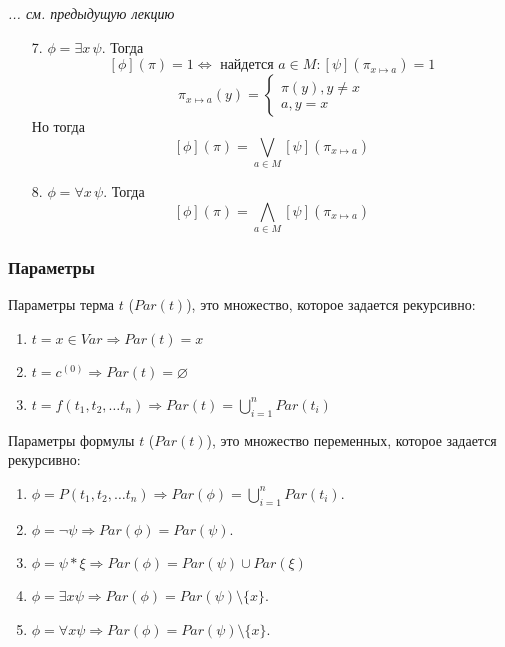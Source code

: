
\begin{center}
    \textit{... см. предыдущую лекцию}
\end{center}
\begin{enumerate}
    \item[7.] $\phi = \exists x\, \psi$. Тогда
    $$[\phi](\pi) = 1 \Leftrightarrow \text{ найдется } a \in M: [\psi](\pi_{x \mapsto a}) = 1$$
    $$\pi_{x\mapsto a}(y) = \left\{\begin{array}{l}
        \pi(y), y \ne x  \\
        a, y = x
    \end{array}\right.$$
    Но тогда 
    $$[\phi](\pi) = \bigvee_{a \in M} [\psi](\pi_{x \mapsto a})$$
    \item[8.] $\phi = \forall x\, \psi$. Тогда
    $$[\phi](\pi) = \bigwedge_{a \in M} [\psi](\pi_{x \mapsto a})$$
\end{enumerate}

\subsubsection{Параметры}

\begin{definition}
    Параметры терма $t$ ($Par(t)$), это множество, которое задается рекурсивно:
    \begin{enumerate}
        \item $t = x \in Var \Rightarrow Par(t) = x$
        \item $t = c^{(0)} \Rightarrow Par(t) = \varnothing$
        \item $t = f(t_1, t_2, \dots t_n) \Rightarrow Par(t) = \bigcup_{i = 1}^n Par(t_i)$
    \end{enumerate}
\end{definition}

\begin{definition}
    Параметры формулы $t$ ($Par(t)$), это множество переменных, которое задается рекурсивно:
    \begin{enumerate}
        \item $\phi = P(t_1, t_2, \dots t_n) \Rightarrow Par(\phi) = \bigcup_{i = 1}^n Par(t_i)$.
        \item $\phi = \neg \psi \Rightarrow Par(\phi) = Par(\psi)$.
        \item $\phi = \psi * \xi \Rightarrow Par(\phi) = Par(\psi) \cup Par(\xi)$
        \item $\phi = \exists x \psi \Rightarrow Par(\phi) = Par(\psi) \setminus\{x\}$.
        \item $\phi = \forall x \psi \Rightarrow Par(\phi) = Par(\psi) \setminus\{x\}$.
    \end{enumerate}
\end{definition}

